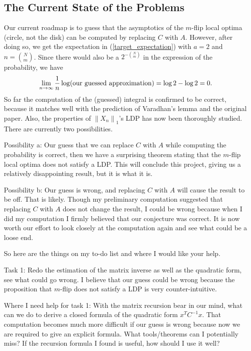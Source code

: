 \documentclass[10pt]{article}
\newcommand{\norm}[1]{\left\lVert#1\right\rVert}
\newenvironment{Proof of lemma}{\noindent{\bf Proof of Lemma}}{\hfill$\Box$\newline}
\newenvironment{Proof of claim}{\noindent{\bf Proof of claim}}{\hfill$\Box$\newline}
\newenvironment{Proof of theorem}{\noindent{\bf Proof of Theorem}}{\hfill\scriptsize{$\Box$}\newline}
\newenvironment{Proof of theorems}{\noindent{\bf Proof of Theorems}}{\hfill$\Box$\newline}
\newenvironment{Proof of proposition}{\noindent{\bf Proof of Proposition}}{\hfill$\Box$\newline}
\newenvironment{Proof of propositions}{\noindent{\bf Proof of Propositions}}{\hfill$\Box$\newline}
\newenvironment{Proof of exercise}{\noindent{\it Proof of Exercise:}}{\hfill$\Box$}
\begin{document}
\subsection*{The Current State of the Problems}

Our current roadmap is to guess that the asymptotics of the $m$-flip local optima (circle, not the disk) can be computed by replacing $C$ with $A$. However, after doing so, we get the expectation in (\ref{target_expectation}) with $a = 2$ and $n = \binom{N}{m}$. Since there would also be a $2^{-\binom{N}{m}}$ in the expression of the probability, we have
\begin{align}
    \lim_{n \to \infty} \frac{1}{n} \log (\text{\normalfont our guessed approximation}) = \log 2 - \log 2 = 0. 
\end{align}
So far the computation of the (guessed) integral is confirmed to be correct, because it matches well with the prediction of Varadhan's lemma and the original paper. Also, the properties of $\norm{X_n}_1$'s LDP has now been thoroughly studied. There are currently two possibilities.

Possibility a: Our guess that we can replace $C$ with $A$ while computing the probability is correct, then we have a surprising theorem stating that the $m$-flip local optima does not satisfy a LDP. This will conclude this project, giving us a relatively disappointing result, but it is what it is.

Possibility b: Our guess is wrong, and replacing $C$ with $A$ will cause the result to be off. That is likely. Though my preliminary computation suggested that replacing $C$ with $A$ does not change the result, I could be wrong because when I did my computation I firmly believed that our conjecture was correct. It is now worth our effort to look closely at the computation again and see what could be a loose end.

So here are the things on my to-do list and where I would like your help.

Task 1: Redo the estimation of the matrix inverse as well as the quadratic form, see what could go wrong. I believe that our guess could be wrong because the proposition that $m$-flip does not satisfy a LDP is very counter-intuitive.

Where I need help for task 1: With the matrix recursion bear in our mind, what can we do to derive a closed formula of the quadratic form $x^TC^{-1}x$. That computation becomes much more difficult if our guess is wrong because now we are required to give an explicit formula. What tools/theorems can I potentially miss? If the recursion formula I found is useful, how should I use it well?
\end{document}
